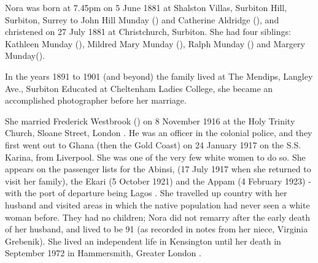 
Nora was born at 7.45pm on 5 June 1881 at  Shalston Villas, Surbiton Hill,  Surbiton, Surrey to John Hill Munday () and Catherine Aldridge (), and christened on 27 July 1881 at Christchurch, Surbiton.\cite{NoraMundayBirth} 	She had four siblings: Kathleen Munday (), Mildred Mary Munday (), Ralph Munday () and Margery Munday().

In the years  1891 to 1901 (and beyond) the family lived at The Mendips, Langley Ave., Surbiton \cite{NoraMundayResidence}  Educated at Cheltenham Ladies College, she became an accomplished photographer before her marriage.
\cite{NoraMundayOccupation}

She married Frederick Westbrook () on 8 November 1916 at the Holy Trinity Church, Sloane Street, London \cite{NoraMundayMarriage}.  He was an officer in the colonial police, and they first went out to Ghana (then the Gold Coast) on 24 January 1917 on the S.S. Karina, from Liverpool. She was one of the very few white women to do so. She appears on the passenger lists for the Abinsi, (17 July 1917 when she returned to visit her family), the Ekari (5 October 1921) and the Appam (4 February 1923) - with the port of departure being Lagos \cite{NoraMundayTravel}. She travelled up country with her husband and visited areas in which the native population had never seen a white woman before.  They had no children; Nora did not remarry after the early death of her husband, and lived to be 91 (as recorded in notes from her niece, Virginia Grebenik). She lived an independent life in Kensington until her death in September 1972 in 	Hammersmith, Greater London \cite{NoraMundayDeath}.

